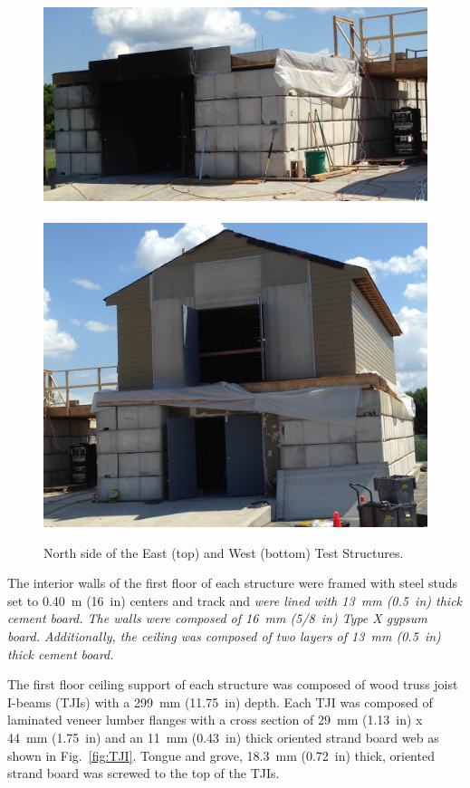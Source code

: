 \documentclass[12pt,oneside]{book}
\begin{document}
\begin{figure}[!ht]
	\includegraphics[width=5.25in]{../../Hose_Stream_Report/Figures/Pictures/east_structure}
	\\~\\
	\includegraphics[width=5.25in]{../../Hose_Stream_Report/Figures/Pictures/west_structure}
	\caption[North side of the East and West Structures.]{North side of the East (top) and West (bottom) Test Structures.}
	\label{fig:struct_pics}
\end{figure}

The interior walls of the first floor of each structure were framed with steel studs set to 0.40~m (16~in) centers and track and \textit{were lined with 13~mm (0.5~in) thick cement board. The walls were composed of 16~mm (5/8~in) Type X gypsum board. Additionally, the ceiling was composed of two layers of 13~mm (0.5~in) thick cement board.}
\FloatBarrier

The first floor ceiling support of each structure was composed of wood truss joist I-beams (TJIs) with a 299~mm (11.75~in) depth. Each TJI was composed of laminated veneer lumber flanges with a cross section of 29~mm (1.13~in) x 44~mm (1.75~in) and an 11~mm (0.43~in) thick oriented strand board web as shown in Fig.~\ref{fig:TJI}. Tongue and grove, 18.3~mm (0.72~in) thick, oriented strand board was screwed to the top of the TJIs.
\end{document}
